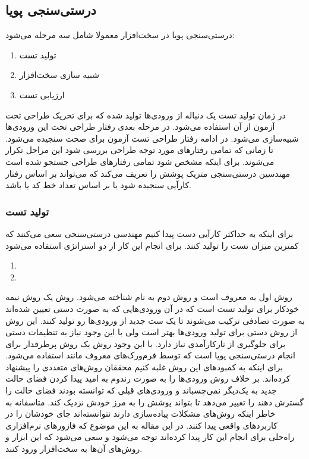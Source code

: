 \documentclass[conference]{IEEEtran}
\begin{document}
\subsection{درستی‌سنجی پویا}
درستی‌سنجی پویا در سخت‌افزار معمولا شامل سه مرحله می‌شود:
\begin{enumerate}
    \item تولید تست
    \item شبیه سازی سخت‌افزار
    \item ارزیابی تست
\end{enumerate}
در زمان تولید تست یک دنباله از ورودی‌ها تولید شده که برای تحریک طراحی تحت آزمون از آن استفاده
می‌شود. در مرحله بعدی رفتار طراحی تحت این ورودی‌ها شبیه‌سازی می‌شود. در ادامه رفتار
طراحی تست آزمون برای صحت سنجیده می‌شود.
تا زمانی که تمامی رفتار‌های مورد توجه طراحی بررسی شود این مراحل تکرار می‌شوند.
برای اینکه مشخص شود تمامی رفتار‌های طراحی جستجو شده است مهندسین درستی‌سنجی
متریک پوشش را تعریف می‌کند که می‌تواند بر اساس رفتار کارآیی سنجیده شود
یا بر اساس تعداد خط کد یا
باشد.

\subsubsection{تولید تست}
برای اینکه به حداکثر کارآیی دست پیدا کنیم مهندسی درستی‌سنجی سعی می‌کنند که کمترین میزان
تست را تولید کنند.
برای انجام این کار از دو استراتژی استفاده می‌شود
\begin{enumerate}
    \item {}
    \item {}
\end{enumerate}
روش اول به
معروف است و روش دوم به نام
شناخته می‌شود.
روش
یک روش نیمه‌ خودکار برای تولید تست است که در آن ورودی‌هایی که به صورت دستی تعیین شده‌اند
به صورت تصادفی ترکیب می‌شوند تا یک ست جدید از ورودی‌ها رو تولید کنند.
این روش از روش دستی برای تولید ورودی‌ها بهتر است ولی با این وجود نیاز به تنظیمات دستی
برای جلوگیری از نارکارآمدی نیاز دارد.
با این وجود روش
یک روش پرطرفدار برای انجام درستی‌سنجی پویا است
که توسط فرم‌ورک‌های معروف مانند
استفاده می‌شود.
برای اینکه به کمبود‌های این روش غلبه کنیم محققان روش‌های متعددی را پیشنهاد کرده‌اند.
بر خلاف
روش
ورودی‌ها را به صورت رندوم به امید پیدا کردن فضای‌ حالت جدید به یک‌دیگر نمی‌‌چسباند و
ورودی‌های قبلی که توانسته بودند فضای حالت را گسترش دهند را تغییر می‌دهد تا بتواند
پوشش را به مرز خودش نزدیک کند.
متاسفانه به خاطر اینکه روش‌های
مشکلات پیاده‌سازی دارند نتوانسته‌اند جای خودشان را در کاربرد‌های واقعی پیدا کنند.
در این مقاله به این موضوع که فازور‌های نرم‌افزاری راه‌حلی برای انجام این کار پیدا کرده‌اند توجه می‌شود
و سعی می‌شود که این ابزار و روش‌های آن‌ها به سخت‌افزار ورود کنند.
\end{document}
